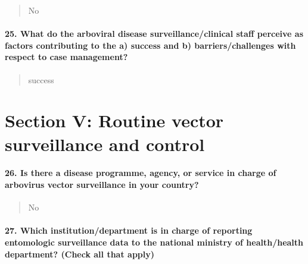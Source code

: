 \documentclass[
]{article}
\begin{document}
\begin{quote}
No
\end{quote}

\hypertarget{what-do-the-arboviral-disease-surveillanceclinical-staff-perceive-as-factors-contributing-to-the-a-success-and-b-barrierschallenges-with-respect-to-case-management}{%
\paragraph{25. What do the arboviral disease surveillance/clinical staff
perceive as factors contributing to the a) success and b)
barriers/challenges with respect to case
management?}\label{what-do-the-arboviral-disease-surveillanceclinical-staff-perceive-as-factors-contributing-to-the-a-success-and-b-barrierschallenges-with-respect-to-case-management}}

\begin{quote}
success
\end{quote}

\hypertarget{section-v-routine-vector-surveillance-and-control}{%
\section{Section V: Routine vector surveillance and
control}\label{section-v-routine-vector-surveillance-and-control}}

\hypertarget{is-there-a-disease-programme-agency-or-service-in-charge-of-arbovirus-vector-surveillance-in-your-country}{%
\paragraph{26. Is there a disease programme, agency, or service in
charge of arbovirus vector surveillance in your
country?}\label{is-there-a-disease-programme-agency-or-service-in-charge-of-arbovirus-vector-surveillance-in-your-country}}

\begin{quote}
No
\end{quote}

\hypertarget{which-institutiondepartment-is-in-charge-of-reporting-entomologic-surveillance-data-to-the-national-ministry-of-healthhealth-department-check-all-that-apply}{%
\paragraph{27. Which institution/department is in charge of reporting
entomologic surveillance data to the national ministry of health/health
department? (Check all that
apply)}\label{which-institutiondepartment-is-in-charge-of-reporting-entomologic-surveillance-data-to-the-national-ministry-of-healthhealth-department-check-all-that-apply}}
\end{document}
